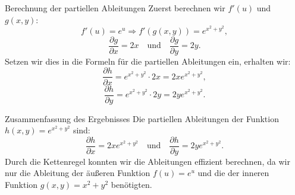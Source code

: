 \documentclass{beamer}
\begin{document}
        \begin{frame}{Berechnung der partiellen Ableitungen}
            Zuerst berechnen wir \( f'(u) \) und \( g(x, y) \):
            \[
            f'(u) = e^u \Rightarrow f'(g(x, y)) = e^{x^2 + y^2},
            \]
            \[
            \frac{\partial g}{\partial x} = 2x \quad \text{und} \quad \frac{\partial g}{\partial y} = 2y.
            \]
            Setzen wir dies in die Formeln für die partiellen Ableitungen ein, erhalten wir:
            \[
            \frac{\partial h}{\partial x} = e^{x^2 + y^2} \cdot 2x = 2x e^{x^2 + y^2},
            \]
            \[
            \frac{\partial h}{\partial y} = e^{x^2 + y^2} \cdot 2y = 2y e^{x^2 + y^2}.
            \]
        \end{frame}
        
        \begin{frame}{Zusammenfassung des Ergebnisses}
            Die partiellen Ableitungen der Funktion \( h(x, y) = e^{x^2 + y^2} \) sind:
            \[
            \frac{\partial h}{\partial x} = 2x e^{x^2 + y^2} \quad \text{und} \quad \frac{\partial h}{\partial y} = 2y e^{x^2 + y^2}.
            \]
            Durch die Kettenregel konnten wir die Ableitungen effizient berechnen, da wir nur die Ableitung der äußeren Funktion \( f(u) = e^u \) und die der inneren Funktion \( g(x, y) = x^2 + y^2 \) benötigten.
        \end{frame}
    
    
     
\end{document}
